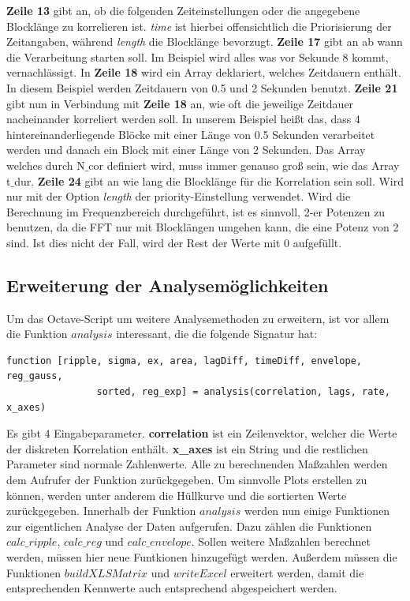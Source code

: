 \textbf{Zeile 13} gibt an, ob die folgenden Zeiteinstellungen oder die angegebene Blocklänge zu korrelieren ist. \textit{time} ist hierbei offensichtlich die Priorisierung der Zeitangaben, während \textit{length} die Blocklänge bevorzugt.\newline
\textbf{Zeile 17} gibt an ab wann die Verarbeitung starten soll. Im Beispiel wird alles was vor Sekunde 8 kommt, vernachlässigt. \newline
In \textbf{Zeile 18} wird ein Array deklariert, welches Zeitdauern enthält. In diesem Beispiel werden Zeitdauern von 0.5 und 2 Sekunden benutzt. \newline
\textbf{Zeile 21} gibt nun in Verbindung mit \textbf{Zeile 18} an, wie oft die jeweilige Zeitdauer nacheinander korreliert werden soll. In unserem Beispiel heißt das, dass 4 hintereinanderliegende Blöcke mit einer Länge von 0.5 Sekunden verarbeitet werden und danach ein Block mit einer Länge von 2 Sekunden. Das Array welches durch N$\_$cor definiert wird, muss immer genauso groß sein, wie das Array t$\_$dur.\newline
\textbf{Zeile 24} gibt an wie lang die Blocklänge für die Korrelation sein soll. Wird nur mit der Option \textit{length} der priority-Einstellung verwendet. Wird die Berechnung im Frequenzbereich durchgeführt, ist es sinnvoll, 2-er Potenzen zu benutzen, da die FFT nur mit Blocklängen umgehen kann, die eine Potenz von 2 sind. Ist dies nicht der Fall, wird der Rest der Werte mit 0 aufgefüllt.\newline

\subsection{Erweiterung der Analysemöglichkeiten}
Um das Octave-Script um weitere Analysemethoden zu erweitern, ist vor allem die Funktion $analysis$ interessant, die die folgende Signatur hat:
\begin{lstlisting}
function [ripple, sigma, ex, area, lagDiff, timeDiff, envelope, reg_gauss, 
                sorted, reg_exp] = analysis(correlation, lags, rate, x_axes)
\end{lstlisting}
Es gibt 4 Eingabeparameter. \textbf{correlation} ist ein Zeilenvektor, welcher die Werte der diskreten Korrelation enthält. \textbf{x_axes} ist ein String und die restlichen Parameter sind normale Zahlenwerte. Alle zu berechnenden Maßzahlen werden dem Aufrufer der Funktion zurückgegeben. Um sinnvolle Plots erstellen zu können, werden unter anderem die Hüllkurve und die sortierten Werte zurückgegeben.  
Innerhalb der Funktion $analysis$ werden nun einige Funktionen zur eigentlichen Analyse der Daten aufgerufen. Dazu zählen die Funktionen $calc\_ripple$, $calc\_reg$ und $calc\_envelope$. Sollen weitere Maßzahlen berechnet werden, müssen hier neue Funtkionen hinzugefügt werden. Außerdem müssen die Funktionen $buildXLSMatrix$ und $writeExcel$ erweitert werden, damit die entsprechenden Kennwerte auch entsprechend abgespeichert werden.
